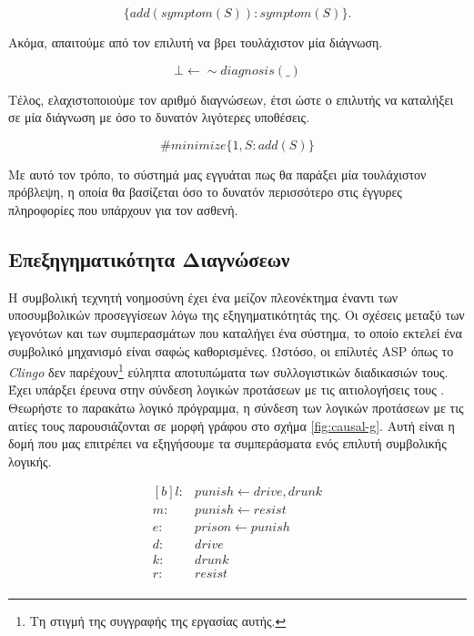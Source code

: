 \documentclass[12pt]{extarticle}
\begin{document}
\begin{equation}
    \{ add(symptom(S)) : symptom(S) \}.
\end{equation}

Ακόμα, απαιτούμε από τον επιλυτή να βρει τουλάχιστον μία διάγνωση.

\begin{equation}
    \bot \longleftarrow \sim diagnosis(\_)
\end{equation}

Τέλος, ελαχιστοποιούμε τον αριθμό  διαγνώσεων, έτσι ώστε ο επιλυτής 
να καταλήξει σε μία διάγνωση με όσο το δυνατόν λιγότερες υποθέσεις.

\begin{equation}
    \#minimize \{ 1, S : add(S) \}
\end{equation}

Με αυτό τον τρόπο, το σύστημά μας εγγυάται πως θα παράξει μία τουλάχιστον πρόβλεψη, η οποία 
θα βασίζεται όσο το δυνατόν περισσότερο στις έγγυρες πληροφορίες που υπάρχουν για τον ασθενή.

\subsection{Επεξηγηματικότητα Διαγνώσεων}

Η συμβολική τεχνητή νοημοσύνη έχει ένα μείζον πλεονέκτημα έναντι των υποσυμβολικών προσεγγίσεων λόγω της εξηγηματικότητάς της.
Οι σχέσεις μεταξύ των γεγονότων και των συμπερασμάτων που καταλήγει ένα σύστημα, το οποίο εκτελεί ένα συμβολικό μηχανισμό είναι σαφώς καθορισμένες.
Ωστόσο, οι επίλυτές ASP όπως το \textit{Clingo} δεν παρέχουν\footnote{Τη στιγμή της συγγραφής της εργασίας αυτής.} εύληπτα αποτυπώματα των συλλογιστικών διαδικασιών τους.
Έχει υπάρξει έρευνα στην σύνδεση λογικών προτάσεων 
με τις αιτιολογήσεις τους \cite{cabalar2014causal}.
Θεωρήστε το παρακάτω λογικό πρόγραμμα, η σύνδεση των λογικών προτάσεων με τις αιτίες τους παρουσιάζονται 
σε μορφή γράφου στο σχήμα \ref{fig:causal-g}. Αυτή είναι η δομή που μας επιτρέπει 
να εξηγήσουμε τα συμπεράσματα ενός επιλυτή συμβολικής λογικής.

\begin{equation}
\begin{aligned}[b]
    l :& punish \longleftarrow drive, drunk \\
    m :& punish \longleftarrow resist \\
    e :& prison \longleftarrow punish \\
    d :& drive \\
    k :& drunk \\
    r :& resist \\
\end{aligned}
\label{eq:example-cg}
\end{equation}
\end{document}
